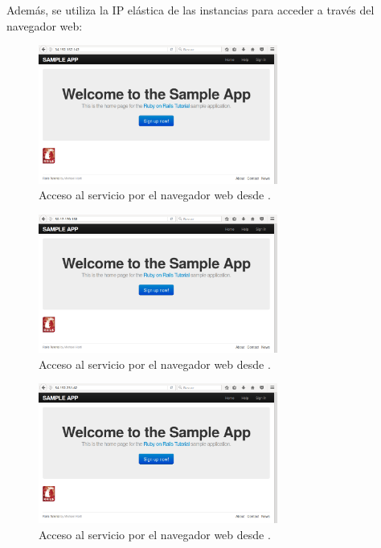 Además, se utiliza la IP elástica de las instancias para acceder a través del navegador web:

\begin{figure}[H]
\centering
\includegraphics[width=0.7\textwidth]{images/figures/nav-1.png}
\caption{Acceso al servicio por el navegador web desde .}
\end{figure}

\begin{figure}[H]
\centering
\includegraphics[width=0.7\textwidth]{images/figures/nav-2.png}
\caption{Acceso al servicio por el navegador web desde .}
\end{figure}

\begin{figure}[H]
\centering
\includegraphics[width=0.7\textwidth]{images/figures/nav-3.png}
\caption{Acceso al servicio por el navegador web desde .}
\end{figure}

